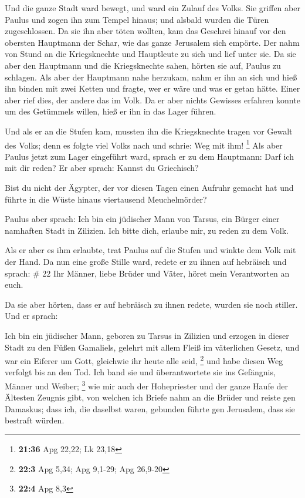  Und die ganze Stadt ward bewegt, und ward ein Zulauf des
Volks. Sie griffen aber Paulus und zogen ihn zum Tempel hinaus; und
alsbald wurden die Türen zugeschlossen.  Da sie ihn aber
töten wollten, kam das Geschrei hinauf vor den obersten Hauptmann der
Schar, wie das ganze Jerusalem sich empörte.  Der nahm von
Stund an die Kriegsknechte und Hauptleute zu sich und lief unter sie. Da
sie aber den Hauptmann und die Kriegsknechte sahen, hörten sie auf,
Paulus zu schlagen.  Als aber der Hauptmann nahe herzukam,
nahm er ihn an sich und hieß ihn binden mit zwei Ketten und fragte, wer
er wäre und was er getan hätte.  Einer aber rief dies, der
andere das im Volk. Da er aber nichts Gewisses erfahren konnte um des
Getümmels willen, hieß er ihn in das Lager führen.

 Und als er an die Stufen kam, mussten ihn die
Kriegsknechte tragen vor Gewalt des Volks;  denn es folgte
viel Volks nach und schrie: Weg mit ihm! \footnote{\textbf{21:36} Apg
  22,22; Lk 23,18}  Als aber Paulus jetzt zum Lager
eingeführt ward, sprach er zu dem Hauptmann: Darf ich mit dir reden? Er
aber sprach: Kannst du Griechisch?

 Bist du nicht der Ägypter, der vor diesen Tagen einen
Aufruhr gemacht hat und führte in die Wüste hinaus viertausend
Meuchelmörder?

 Paulus aber sprach: Ich bin ein jüdischer Mann von Tarsus,
ein Bürger einer namhaften Stadt in Zilizien. Ich bitte dich, erlaube
mir, zu reden zu dem Volk.

 Als er aber es ihm erlaubte, trat Paulus auf die Stufen
und winkte dem Volk mit der Hand. Da nun eine große Stille ward, redete
er zu ihnen auf hebräisch und sprach: \# 22  Ihr Männer,
liebe Brüder und Väter, höret mein Verantworten an euch.

 Da sie aber hörten, dass er auf hebräisch zu ihnen redete,
wurden sie noch stiller. Und er sprach:

 Ich bin ein jüdischer Mann, geboren zu Tarsus in Zilizien
und erzogen in dieser Stadt zu den Füßen Gamaliels, gelehrt mit allem
Fleiß im väterlichen Gesetz, und war ein Eiferer um Gott, gleichwie ihr
heute alle seid, \footnote{\textbf{22:3} Apg 5,34; Apg 9,1-29; Apg
  26,9-20}  und habe diesen Weg verfolgt bis an den Tod. Ich
band sie und überantwortete sie ins Gefängnis, Männer und Weiber;
\footnote{\textbf{22:4} Apg 8,3}  wie mir auch der
Hohepriester und der ganze Haufe der Ältesten Zeugnis gibt, von welchen
ich Briefe nahm an die Brüder und reiste gen Damaskus; dass ich, die
daselbst waren, gebunden führte gen Jerusalem, dass sie bestraft würden.

